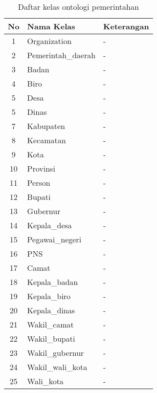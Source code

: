 \begin{table}[!]
	\caption{Daftar kelas ontologi pemerintahan}
	\label{table:ontogov_class}
	\begin{tabularx}{\textwidth}{|c|X|X|}
		\hline
		No & Nama Kelas & Keterangan \\
		\hline
		1 & Organization & - \\
		\hline
		2 & Pemerintah\_daerah & - \\
		\hline
		3 & Badan & - \\
		\hline
		4 & Biro & - \\
		\hline
		5 & Desa & - \\
		\hline
		5 & Dinas & - \\
		\hline
		7 & Kabupaten & - \\
		\hline
		8 & Kecamatan & - \\
		\hline
		9 & Kota & - \\
		\hline
		10 & Provinsi & - \\
		\hline
		11 & Person & - \\
		\hline
		12 & Bupati & - \\
		\hline
		13 & Gubernur & - \\
		\hline
		14 & Kepala\_desa & - \\
		\hline
		15 & Pegawai\_negeri & - \\
		\hline
		16 & PNS & - \\
		\hline
		17 & Camat & - \\
		\hline
		18 & Kepala\_badan & - \\
		\hline
		19 & Kepala\_biro & - \\
		\hline
		20 & Kepala\_dinas & - \\
		\hline
		21 & Wakil\_camat & - \\
		\hline
		22 & Wakil\_bupati & - \\
		\hline
		23 & Wakil\_gubernur & - \\
		\hline
		24 & Wakil\_wali\_kota & - \\
		\hline
		25 & Wali\_kota & - \\
		\hline
	\end{tabularx}
\end{table}